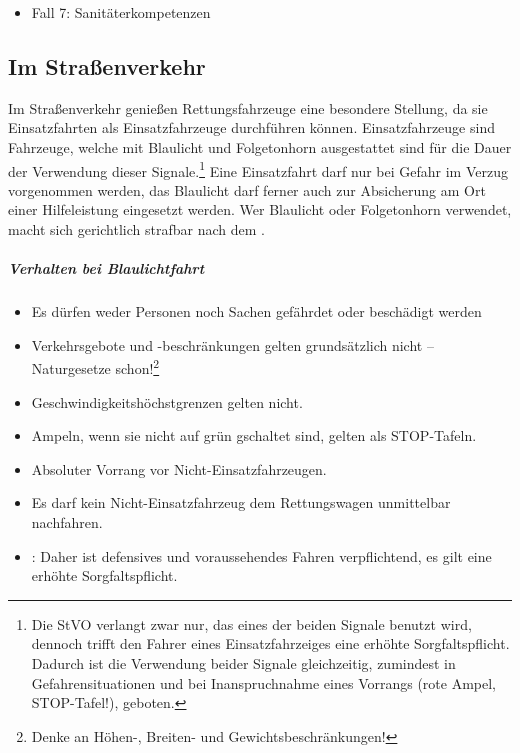 {
\begin{itemize}
  \item Fall 7: Sanitäterkompetenzen
  \dotfill{}
\end{itemize}
}
{}
{}
{}
{}




\subsection{Im Straßenverkehr}

\label{topic:einsatzfahrt}
\label{topic:einsatzfahrtt-missbrauch}
Im Straßenverkehr genießen Rettungsfahrzeuge eine besondere
Stellung, da sie Einsatzfahrten als Einsatzfahrzeuge
durchführen können.
Einsatzfahrzeuge sind Fahrzeuge, welche mit Blaulicht und
Folgetonhorn ausgestattet sind für die Dauer der Verwendung
dieser Signale.\footnote{Die StVO verlangt zwar nur, das
eines der beiden Signale benutzt wird, dennoch trifft den
Fahrer eines Einsatzfahrzeiges eine erhöhte
Sorgfaltspflicht. Dadurch ist die Verwendung beider Signale
gleichzeitig, zumindest in Gefahrensituationen und bei
Inanspruchnahme eines Vorrangs (rote Ampel, STOP-Tafel!),
geboten.} Eine Einsatzfahrt
darf nur bei Gefahr im Verzug vorgenommen werden, das
Blaulicht darf ferner auch zur Absicherung am
Ort einer Hilfeleistung eingesetzt
werden. 
Wer Blaulicht oder Folgetonhorn 
verwendet, macht sich gerichtlich strafbar nach dem
. 

\subparagraph{Verhalten bei Blaulichtfahrt}

\begin{itemize}
    \item Es dürfen weder Personen noch Sachen gefährdet oder beschädigt
    werden
    \item Verkehrsgebote und -beschränkungen gelten
    grundsätzlich nicht -- Naturgesetze
    schon!\footnote{Denke an Höhen-, Breiten- und Gewichtsbeschränkungen!}
    \item Geschwindigkeitshöchstgrenzen gelten nicht.
    \item Ampeln, wenn sie nicht auf grün gschaltet sind,
    gelten als STOP-Tafeln.
    \item Absoluter Vorrang vor Nicht-Einsatzfahrzeugen.
    \item Es darf kein Nicht-Einsatzfahrzeug dem Rettungswagen unmittelbar
    nachfahren.
    \item {}:  Daher ist
    defensives und voraussehendes Fahren verpflichtend, es
    gilt eine erhöhte Sorgfaltspflicht.
\end{itemize}

